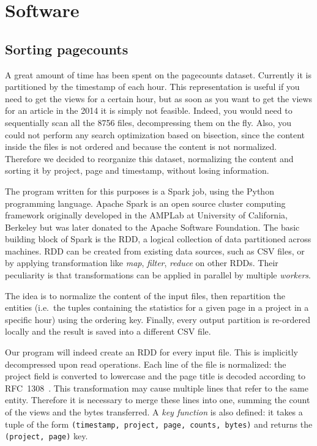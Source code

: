 \section{Software}
\label{sec:software}
\subsection{Sorting pagecounts}
\label{sub:Sorting pagecounts}
A great amount of time has been spent on the pagecounts dataset.
Currently it is partitioned by the timestamp of each hour.
This representation is useful if you need to get the views for a certain hour, but as soon as you want to get the views for an article in the 2014 it is simply not feasible.
Indeed, you would need to sequentially scan all the 8756 files, decompressing them on the fly.
Also, you could not perform any search optimization based on bisection, since the content inside the files is not ordered and because the content is not normalized.
Therefore we decided to reorganize this dataset, normalizing the content and sorting it by project, page and timestamp, without losing information.

The program written for this purposes is a Spark job, using the Python programming language.
Apache Spark is an open source cluster computing framework originally developed in the AMPLab at University of California, Berkeley but was later donated to the Apache Software Foundation.
The basic building block of Spark is the \ac{RDD}, a logical collection of data partitioned across machines.
\ac{RDD} can be created from existing data sources, such as \ac{CSV} files, or by applying transformation like \emph{map}, \emph{filter}, \emph{reduce} on other \acp{RDD}.
Their peculiarity is that transformations can be applied in parallel by multiple \emph{workers}.

The idea is to normalize the content of the input files, then repartition the entities (i.e.\ the tuples containing the statistics for a given page in a project in a specific hour) using the ordering key.
Finally, every output partition is re-ordered locally and the result is saved into a different CSV file.

Our program will indeed create an \ac{RDD} for every input file.
This is implicitly decompressed upon read operations.
Each line of the file is normalized: the project field is converted to lowercase and the page title is decoded according to RFC~1308~\cite{rfc1808}.
This transformation may cause multiple lines that refer to the same entity.
Therefore it is necessary to merge these lines into one, summing the count of the views and the bytes transferred.
A \emph{key function} is also defined: it takes a tuple of the form \texttt{(timestamp, project, page, counts, bytes)} and returns the \texttt{(project, page)} key.

